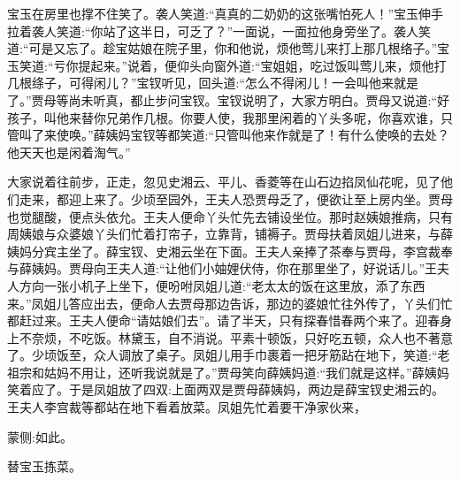\begin{parag}
    宝玉在房里也撑不住笑了。袭人笑道:“真真的二奶奶的这张嘴怕死人！”宝玉伸手拉着袭人笑道:“你站了这半日，可乏了？”一面说，一面拉他身旁坐了。袭人笑道:“可是又忘了。趁宝姑娘在院子里，你和他说，烦他莺儿来打上那几根络子。”宝玉笑道:“亏你提起来。”说着，便仰头向窗外道:“宝姐姐，吃过饭叫莺儿来，烦他打几根绦子，可得闲儿？”宝钗听见，回头道:“怎么不得闲儿！一会叫他来就是了。”贾母等尚未听真，都止步问宝钗。宝钗说明了，大家方明白。贾母又说道:“好孩子，叫他来替你兄弟作几根。你要人使，我那里闲着的丫头多呢，你喜欢谁，只管叫了来使唤。”薛姨妈宝钗等都笑道:“只管叫他来作就是了！有什么使唤的去处？他天天也是闲着淘气。”
\end{parag}


\begin{parag}
    大家说着往前步，正走，忽见史湘云、平儿、香菱等在山石边掐凤仙花呢，见了他们走来，都迎上来了。少顷至园外，王夫人恐贾母乏了，便欲让至上房内坐。贾母也觉腿酸，便点头依允。王夫人便命丫头忙先去铺设坐位。那时赵姨娘推病，只有周姨娘与众婆娘丫头们忙着打帘子，立靠背，铺褥子。贾母扶着凤姐儿进来，与薛姨妈分宾主坐了。薛宝钗、史湘云坐在下面。王夫人亲捧了茶奉与贾母，李宫裁奉与薛姨妈。贾母向王夫人道:“让他们小妯娌伏侍，你在那里坐了，好说话儿。”王夫人方向一张小机子上坐下，便吩咐凤姐儿道:“老太太的饭在这里放，添了东西来。”凤姐儿答应出去，便命人去贾母那边告诉，那边的婆娘忙往外传了，丫头们忙都赶过来。王夫人便命“请姑娘们去”。请了半天，只有探春惜春两个来了。迎春身上不奈烦，不吃饭。林黛玉，自不消说。平素十顿饭，只好吃五顿，众人也不著意了。少顷饭至，众人调放了桌子。凤姐儿用手巾裹着一把牙筋跕在地下，笑道:“老祖宗和姑妈不用让，还听我说就是了。”贾母笑向薛姨妈道:“我们就是这样。”薛姨妈笑着应了。于是凤姐放了四双:上面两双是贾母薛姨妈，两边是薛宝钗史湘云的。王夫人李宫裁等都站在地下看着放菜。凤姐先忙着要干净家伙来，\begin{note}蒙侧:如此。\end{note}替宝玉拣菜。
\end{parag}


